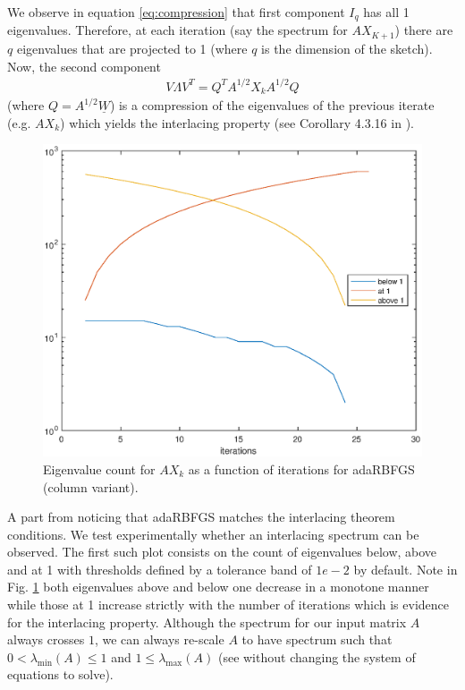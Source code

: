 \documentclass[12pt,conference,compsocconf]{IEEEtran}
\begin{document}
We observe in equation \ref{eq:compression} that first component $I_q$ has all 1 eigenvalues. Therefore, at each iteration (say the spectrum for $AX_{K+1}$) there are $q$ eigenvalues that are projected to 1 (where $q$ is the dimension of the sketch). Now, the second component 
\begin{align}\label{eq:compression2}
	V\Lambda V^T=Q^TA^{1/2}X_kA^{1/2}Q 
\end{align}
(where $Q=A^{1/2}\underline{W}$) is a compression of the eigenvalues of the previous iterate (e.g. $AX_{k}$) which yields the interlacing property (see Corollary 4.3.16 in \cite{Horn}).\\
\begin{figure}
  \centering
  \includegraphics[height=0.7\columnwidth,width=1.0\columnwidth]{eigvalcountiter.eps}
  
  \vspace{-2mm}
  \caption{Eigenvalue count for $AX_k$ as a function of iterations for adaRBFGS (column variant). \label{fig:eigcount}}  
  
\end{figure}
A part from noticing that adaRBFGS matches the interlacing theorem conditions. We test experimentally whether an interlacing spectrum can be observed. The first such plot consists on the count of eigenvalues below, above and at 1 with thresholds defined by a tolerance band of $1e-2$ by default. Note in Fig. \ref{fig:eigcount} both eigenvalues above and below one decrease in a monotone manner while those at 1 increase strictly with the number of iterations which is evidence for the interlacing property. Although the spectrum for our input matrix $A$ always crosses $1$, we can always re-scale $A$ to have spectrum such that $0 < \lambda_{\text{min}}(A) \leq 1$ and $1 \leq \lambda_{\text{max}}(A)$ (see \cite{Stich1,Gratton} without changing the system of equations to solve).\\
\end{document}
